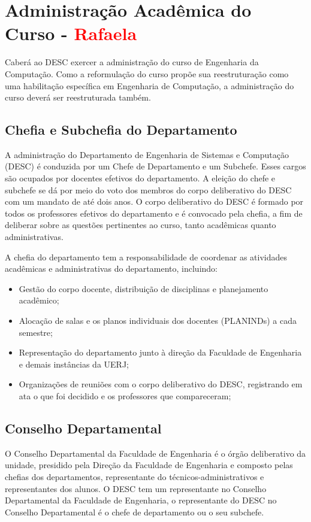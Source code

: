 \section{Administração Acadêmica do Curso - \textcolor{red}{Rafaela}}

Caberá ao DESC exercer a administração do curso de Engenharia da Computação.
Como a reformulação do curso propõe sua reestruturação como uma habilitação específica em Engenharia de Computação, a administração do curso deverá ser reestruturada também.

\subsection{Chefia e Subchefia do Departamento}

A administração do Departamento de Engenharia de Sistemas e Computação (DESC) é conduzida por um Chefe de Departamento e um Subchefe. Esses cargos são ocupados por docentes efetivos do departamento. A eleição do chefe e subchefe se dá por meio do voto dos membros do corpo deliberativo do DESC com um mandato de até dois anos. O corpo deliberativo do DESC é formado por todos os professores efetivos do departamento e é convocado pela chefia, a fim de deliberar sobre as questões pertinentes ao curso, tanto acadêmicas quanto administrativas.

A chefia do departamento tem a responsabilidade de coordenar as atividades acadêmicas e administrativas do departamento, incluindo:

\begin{itemize}
    \item Gestão do corpo docente, distribuição de disciplinas e planejamento acadêmico;
    \item Alocação de salas e os planos individuais dos docentes (PLANINDs) a cada semestre;
    \item Representação do departamento junto à direção da Faculdade de Engenharia e demais instâncias da UERJ;
    \item Organizações de reuniões com o corpo deliberativo do DESC, registrando em ata o que foi decidido e os professores que compareceram;
\end{itemize}

\subsection{Conselho Departamental}

O Conselho Departamental da Faculdade de Engenharia é o órgão deliberativo da unidade, presidido pela Direção da Faculdade de Engenharia e composto pelas chefias dos departamentos, representante do técnicos-administrativos e representantes dos alunos. O DESC tem um representante no Conselho Departamental da Faculdade de Engenharia, o representante do DESC no Conselho Departamental é o chefe de departamento ou o seu subchefe.


